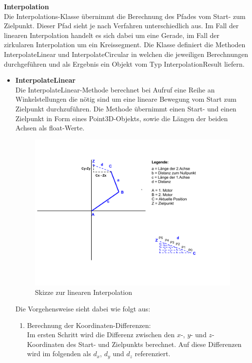 \textbf{Interpolation}\\
Die Interpolations-Klasse übernimmt die Berechnung des Pfades vom Start- zum Zielpunkt. Dieser Pfad sieht je nach Verfahren unterschiedlich aus. Im Fall der linearen Interpolation handelt es sich dabei um eine Gerade, im Fall der zirkularen Interpolation um ein Kreissegment. Die Klasse definiert die Methoden InterpolateLinear und InterpolateCircular in welchen die jeweiligen Berechnungen durchgeführen und als Ergebnis ein Objekt vom Typ InterpolationResult liefern.
\begin{itemize}
\item \textbf{InterpolateLinear}\\
Die InterpolateLinear-Methode berechnet bei Aufruf eine Reihe an Winkelstellungen die nötig sind um eine lineare Bewegung vom Start zum Zielpunkt durchzuführen. Die Methode übernimmt einen Start- und einen Zielpunkt in Form eines Point3D-Objekts, sowie die Längen der beiden Achsen als float-Werte.\\
\begin{figure}[H]
  \centering
  \begin{minipage}[t]{12 cm}
  	\centering
  	\includegraphics[width=12cm]{images/Linearinterpolation} 
    \caption{Skizze zur linearen Interpolation}
  \end{minipage}
\end{figure}
Die Vorgehensweise sieht dabei wie folgt aus:
\begin{enumerate}
\item Berechnung der Koordinaten-Differenzen:\\
Im ersten Schritt wird die Differenz zwischen den $x$-, $y$- und $z$-Koordinaten des Start- und Zielpunkts berechnet. Auf diese Differenzen wird im folgenden als $d_x$, $d_y$ und $d_z$ referenziert. 

\end{enumerate}
\end{itemize}
